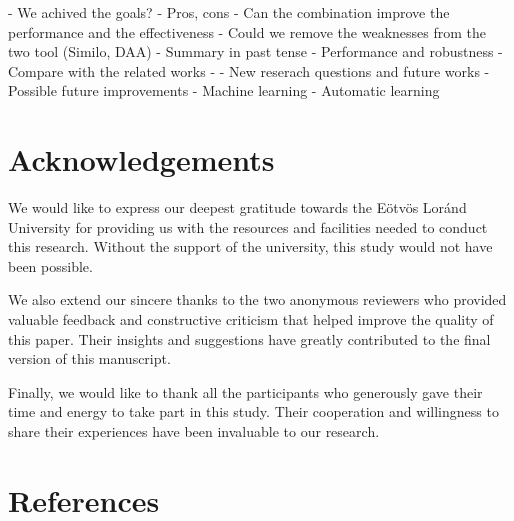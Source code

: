 \documentclass{article}
\begin{document}
- We achived the goals?
  - Pros, cons
  - Can the combination improve the performance and the effectiveness
  - Could we remove the weaknesses from the two tool (Similo, DAA)
- Summary in past tense
  - Performance and robustness
- Compare with the related works
  - 
- New reserach questions and future works
    - Possible future improvements
    - Machine learning
        - Automatic learning

\maketitle

\section{Acknowledgements}

We would like to express our deepest gratitude towards the Eötvös Loránd University for providing us with the resources and facilities needed to conduct this research. Without the support of the university, this study would not have been possible.

We also extend our sincere thanks to the two anonymous reviewers who provided valuable feedback and constructive criticism that helped improve the quality of this paper. Their insights and suggestions have greatly contributed to the final version of this manuscript.

Finally, we would like to thank all the participants who generously gave their time and energy to take part in this study. Their cooperation and willingness to share their experiences have been invaluable to our research.

\maketitle

\section{References}

\printbibliography
\end{document}

